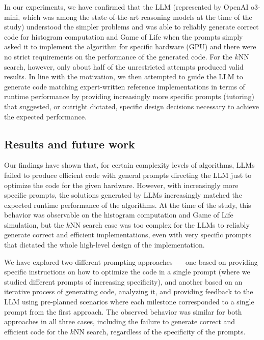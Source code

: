 In our experiments, we have confirmed that the LLM (represented by OpenAI o3-mini, which was among the state-of-the-art reasoning models at the time of the study) understood the simpler problems and was able to reliably generate correct code for histogram computation and Game of Life when the prompts simply asked it to implement the algorithm for specific hardware (GPU\@) and there were no strict requirements on the performance of the generated code. For the $k$NN search, however, only about half of the unrestricted attempts produced valid results. In line with the motivation, we then attempted to guide the LLM to generate code matching expert-written reference implementations in terms of runtime performance by providing increasingly more specific prompts (tutoring) that suggested, or outright dictated, specific design decisions necessary to achieve the expected performance.


\subsection{Results and future work}\label{sec:human-directed-code-optimization-results}

Our findings have shown that, for certain complexity levels of algorithms, LLMs failed to produce efficient code with general prompts directing the LLM just to optimize the code for the given hardware. However, with increasingly more specific prompts, the solutions generated by LLMs increasingly matched the expected runtime performance of the algorithms. At the time of the study, this behavior was observable on the histogram computation and Game of Life simulation, but the $k$NN search case was too complex for the LLMs to reliably generate correct and efficient implementations, even with very specific prompts that dictated the whole high-level design of the implementation.

We have explored two different prompting approaches~--- one based on providing specific instructions on how to optimize the code in a single prompt (where we studied different prompts of increasing specificity), and another based on an iterative process of generating code, analyzing it, and providing feedback to the LLM using pre-planned scenarios where each milestone corresponded to a single prompt from the first approach. The observed behavior was similar for both approaches in all three cases, including the failure to generate correct and efficient code for the $k$NN search, regardless of the specificity of the prompts.

